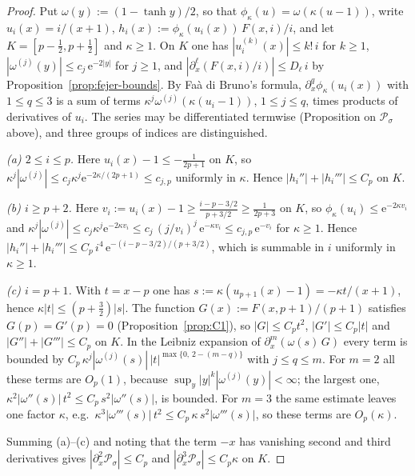 \begin{proof}
Put $\omega(y):=(1-\tanh y)/2$, so that $\phi_\kappa(u)=\omega(\kappa(u-1))$, write $u_i(x)=i/(x+1)$, $h_i(x):=\phi_\kappa(u_i(x))\,F(x,i)/i$, and let $K=[p-\tfrac12,p+\tfrac12]$ and $\kappa\ge1$. On $K$ one has $|u_i^{(k)}(x)|\le k!\,i$ for $k\ge1$, $|\omega^{(j)}(y)|\le c_j\,\mathrm e^{-2|y|}$ for $j\ge1$, and $|\partial_x^\ell(F(x,i)/i)|\le D_\ell\,i$ by Proposition~\ref{prop:fejer-bounds}. By Faà di Bruno's formula, $\partial_x^q\phi_\kappa(u_i(x))$ with $1\le q\le3$ is a sum of terms $\kappa^j\omega^{(j)}(\kappa(u_i-1))$, $1\le j\le q$, times products of derivatives of $u_i$. The series may be differentiated termwise (Proposition on $\mathcal P_\sigma$ above), and three groups of indices are distinguished.

\emph{(a) $2\le i\le p$.} Here $u_i(x)-1\le -\frac{1}{2p+1}$ on $K$, so $\kappa^j|\omega^{(j)}|\le c_j\kappa^j\mathrm e^{-2\kappa/(2p+1)}\le c_{j,p}$ uniformly in $\kappa$. Hence $|h_i''|+|h_i'''|\le C_p$ on $K$.

\emph{(b) $i\ge p+2$.} Here $v_i:=u_i(x)-1\ge\frac{i-p-3/2}{p+3/2}\ge\frac{1}{2p+3}$ on $K$, so $\phi_\kappa(u_i)\le\mathrm e^{-2\kappa v_i}$ and $\kappa^j|\omega^{(j)}|\le c_j\kappa^j\mathrm e^{-2\kappa v_i}\le c_j\,(j/v_i)^j\,\mathrm e^{-\kappa v_i}\le c_{j,p}\,\mathrm e^{-v_i}$ for $\kappa\ge1$. Hence $|h_i''|+|h_i'''|\le C_p\,i^{4}\,\mathrm e^{-(i-p-3/2)/(p+3/2)}$, which is summable in $i$ uniformly in $\kappa\ge1$.

\emph{(c) $i=p+1$.} With $t=x-p$ one has $s:=\kappa(u_{p+1}(x)-1)=-\kappa t/(x+1)$, hence $\kappa|t|\le(p+\tfrac32)|s|$. The function $G(x):=F(x,p+1)/(p+1)$ satisfies $G(p)=G'(p)=0$ (Proposition~\ref{prop:C1}), so $|G|\le C_pt^2$, $|G'|\le C_p|t|$ and $|G''|+|G'''|\le C_p$ on $K$. In the Leibniz expansion of $\partial_x^m(\omega(s)\,G)$ every term is bounded by $C_p\,\kappa^{j}|\omega^{(j)}(s)|\,|t|^{\max\{0,\,2-(m-q)\}}$ with $j\le q\le m$. For $m=2$ all these terms are $O_p(1)$, because $\sup_y|y|^k|\omega^{(j)}(y)|<\infty$; the largest one, $\kappa^2|\omega''(s)|\,t^2\le C_p\,s^2|\omega''(s)|$, is bounded. For $m=3$ the same estimate leaves one factor $\kappa$, e.g.\ $\kappa^3|\omega'''(s)|\,t^2\le C_p\,\kappa\,s^2|\omega'''(s)|$, so these terms are $O_p(\kappa)$.

Summing (a)--(c) and noting that the term $-x$ has vanishing second and third derivatives gives $|\partial_x^2\mathcal P_\sigma|\le C_p$ and $|\partial_x^3\mathcal P_\sigma|\le C_p\kappa$ on $K$.
\end{proof}


